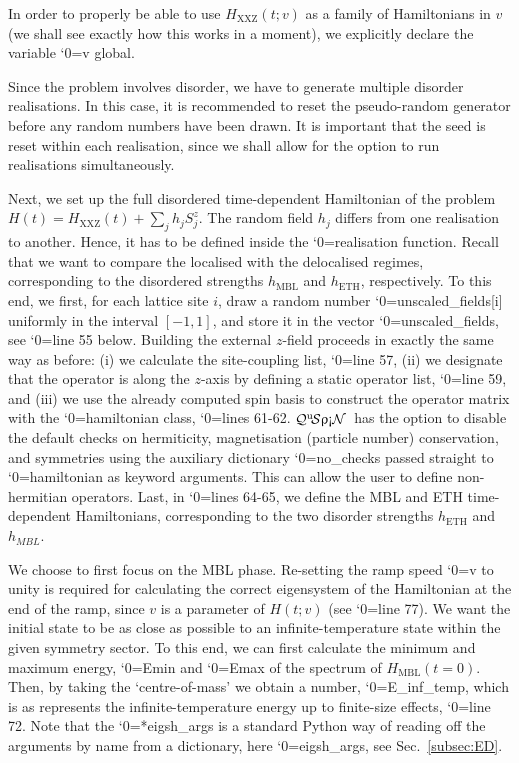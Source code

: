 \documentclass{SciPost}
\newcommand\0{\scalebox{-1}[1]{0}}
\let\svttfamily\ttfamily
\renewcommand\ttfamily{\svttfamily\catcode`0=\active }
\renewcommand\texttt{\bgroup\ttfamily\texttthelp}
\def\texttthelp#1{#1\egroup}
\newcommand{\qspin}{$\mathcal{Q}^{\mathrm{u}}\!\mathcal{S}\uprho\mathrm{\text{\textexclamdown}}\mathcal{N}$}
\begin{document}

%
In order to properly be able to use $H_\mathrm{XXZ}(t;v)$ as a family of Hamiltonians in $v$ (we shall see exactly how this works in a moment), we explicitly declare the variable \texttt{v} global.  

%
Since the problem involves disorder, we have to generate multiple disorder realisations. In this case, it is recommended to reset the pseudo-random generator before any random numbers have been drawn. It is important that the seed is reset within each realisation, since we shall allow for the option to run realisations simultaneously.  

%
Next, we set up the full disordered time-dependent Hamiltonian of the problem $H(t) = H_\mathrm{XXZ}(t) + \sum_j h_jS^z_j$. The random field $h_j$ differs from one realisation to another. Hence, it has to be defined inside the \texttt{realisation} function. Recall that we want to compare the localised with the delocalised regimes, corresponding to the disordered strengths $h_\mathrm{MBL}$ and $h_\mathrm{ETH}$, respectively. To this end, we first, for each lattice site $i$, draw a random number \texttt{unscaled\_fields[i]} uniformly in the interval $[-1,1]$, and store it in the vector \texttt{unscaled\_fields}, see \texttt{line 55} below. Building the external $z$-field proceeds in exactly the same way as before: (i) we calculate the site-coupling list, \texttt{line 57}, (ii) we designate that the operator is along the $z$-axis by defining a static operator list, \texttt{line 59}, and (iii) we use the already computed spin basis to construct the operator matrix with the \texttt{hamiltonian} class, \texttt{lines 61-62}. \qspin\ has the option to disable the default checks on hermiticity, magnetisation (particle number) conservation, and symmetries using the auxiliary dictionary \texttt{no\_checks} passed straight to \texttt{hamiltonian} as keyword arguments. This can allow the user to define non-hermitian operators. Last, in \texttt{lines 64-65}, we define the MBL and ETH time-dependent Hamiltonians, corresponding to the two disorder strengths $h_\mathrm{ETH}$ and $h_{MBL}$.  

%
We choose to first focus on the MBL phase. Re-setting the ramp speed \texttt{v} to unity is required for calculating the correct eigensystem of the Hamiltonian at the end of the ramp, since $v$ is a parameter of $H(t;v)$ (see \texttt{line 77}). We want the initial state to be as close as possible to an infinite-temperature state within the given symmetry sector. To this end, we can first calculate the minimum and maximum energy, \texttt{Emin} and \texttt{Emax} of the spectrum of $H_\mathrm{MBL}(t=0)$. Then, by taking the `centre-of-mass' we obtain a number, \texttt{E\_inf\_temp}, which is as represents the infinite-temperature energy up to finite-size effects, \texttt{line 72}. Note that the \texttt{**eigsh\_args} is a standard Python way of reading off the arguments by name from a dictionary, here \texttt{eigsh\_args}, see Sec.~\ref{subsec:ED}.
\end{document}
